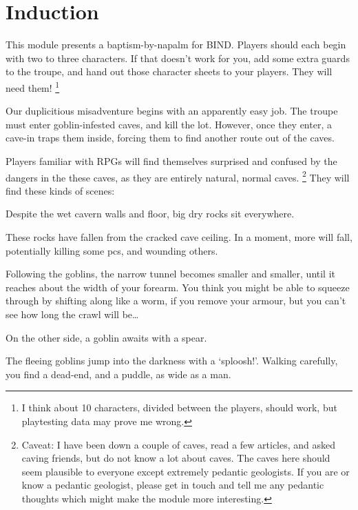 \section{Induction}
\begin{multicols}{2}

\noindent
This module presents a baptism-by-napalm for BIND.
Players should each begin with two to three characters.
If that doesn't work for you, add some extra \glspl{guard} to the troupe, and hand out those character sheets to your players.
They will need them!%
\footnote{I think about 10 characters, divided between the players, should work, but playtesting data may prove me wrong.}

Our duplicitious misadventure begins with an apparently easy job.
The troupe must enter goblin-infested caves, and kill the lot.
However, once they enter, a cave-in traps them inside, forcing them to find another route out of the caves.

Players familiar with RPGs will find themselves surprised and confused by the dangers in the these caves, as they are entirely natural, normal caves.%
\footnote{Caveat: I have been down a couple of caves, read a few articles, and asked caving friends, but do not know a lot about caves.
The caves here should seem plausible to everyone except extremely pedantic geologists.
If you are or know a pedantic geologist, please get in touch and tell me any pedantic thoughts which might make the module more interesting.}
They will find these kinds of scenes:

\begin{boxtext}
  Despite the wet cavern walls and floor, big dry rocks sit everywhere.
\end{boxtext}

\noindent
These rocks have fallen from the cracked cave ceiling.
In a moment, more will fall, potentially killing some \glspl{pc}, and wounding others.

\begin{boxtext}
  Following the goblins, the narrow tunnel becomes smaller and smaller, until it reaches about the width of your forearm.
  You think you might be able to squeeze through by shifting along like a worm, if you remove your armour, but you can't see how long the crawl will be\ldots
\end{boxtext}

\noindent
On the other side, a goblin awaits with a spear.

\begin{boxtext}
  The fleeing goblins jump into the darkness with a `sploosh!'.
  Walking carefully, you find a dead-end, and a puddle, as wide as a man.
\end{boxtext}


\end{multicols}
